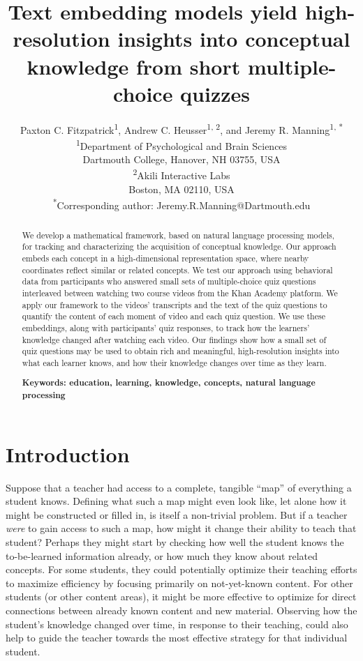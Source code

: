 \documentclass[10pt]{article}
\title{Text embedding models yield high-resolution insights into conceptual
knowledge from short multiple-choice quizzes}
\author{Paxton C. Fitzpatrick\textsuperscript{1},
Andrew C. Heusser\textsuperscript{1, 2}, and Jeremy R.
Manning\textsuperscript{1, *}\\\small{\textsuperscript{1}Department of Psychological and Brain Sciences}\\\small{Dartmouth College, Hanover, NH 03755, USA}\\\small{\textsuperscript{2}Akili Interactive Labs}\\\small{Boston, MA 02110, USA}\\\small{\textsuperscript{*}Corresponding author:
Jeremy.R.Manning@Dartmouth.edu}}
\date{}
\begin{document}
\maketitle

\begin{abstract}\noindent We develop a mathematical framework, based on natural
language processing models, for tracking and characterizing the acquisition of
conceptual knowledge. Our approach embeds each concept in a high-dimensional
representation space, where nearby coordinates reflect similar or related
concepts. We test our approach using behavioral data from participants who
answered small sets of multiple-choice quiz questions interleaved between
watching two course videos from the Khan Academy platform. We apply our
framework to the videos' transcripts and the text of the quiz questions to
quantify the content of each moment of video and each quiz question. We use
these embeddings, along with participants' quiz responses, to track how the
learners' knowledge changed after watching each video. Our findings show how a
small set of quiz questions may be used to obtain rich and meaningful, high-resolution
insights into what each learner knows, and how their knowledge
changes over time as they learn.

\textbf{Keywords: education, learning, knowledge, concepts, natural language processing}

\end{abstract}


\section*{Introduction}

Suppose that a teacher had access to a complete, tangible ``map'' of everything
a student knows. Defining what such a map might even look like, let alone how it
might be constructed or filled in, is itself a non-trivial problem. But if a
teacher \textit{were} to gain access to such a map, how might it change their
ability to teach that student? Perhaps they might start by checking how well
the student knows the to-be-learned information already, or how much they know
about related concepts. For some students, they could potentially optimize
their teaching efforts to maximize efficiency by focusing primarily on
not-yet-known content. For other students (or other content areas), it might be
more effective to optimize for direct connections between already known content
and new material. Observing how the student's knowledge changed over time, in
response to their teaching, could also help to guide the teacher towards the
most effective strategy for that individual student.
\end{document}

